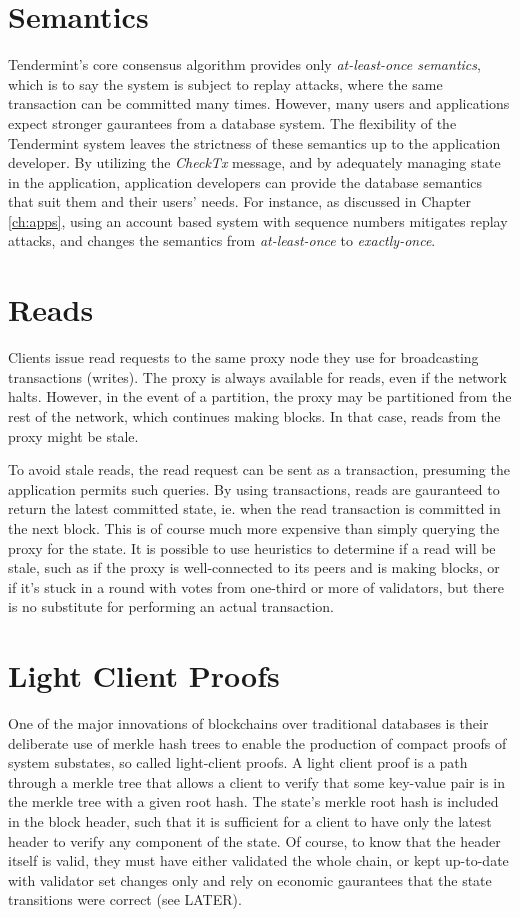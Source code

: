 \section{Semantics}

Tendermint's core consensus algorithm provides only \emph{at-least-once semantics}, 
which is to say the system is subject to replay attacks, 
where the same transaction can be committed many times.
However, many users and applications expect stronger gaurantees from a database system.
The flexibility of the Tendermint system leaves the strictness of these semantics up to the application developer.
By utilizing the \emph{CheckTx} message, and by adequately managing state in the application, 
application developers can provide the database semantics that suit them and their users' needs.
For instance, as discussed in Chapter \ref{ch:apps}, 
using an account based system with sequence numbers mitigates replay attacks,
and changes the semantics from \emph{at-least-once} to \emph{exactly-once}.

\section{Reads} 

Clients issue read requests to the same proxy node they use for broadcasting transactions (writes).
The proxy is always available for reads, even if the network halts.
However, in the event of a partition, the proxy may be partitioned from the rest of the network, which continues making blocks.
In that case, reads from the proxy might be stale.

To avoid stale reads, the read request can be sent as a transaction, presuming the application permits such queries.
By using transactions, reads are gauranteed to return the latest committed state, ie. when the read transaction is committed in the next block.
This is of course much more expensive than simply querying the proxy for the state.
It is possible to use heuristics to determine if a read will be stale,
such as if the proxy is well-connected to its peers and is making blocks, 
or if it's stuck in a round with votes from one-third or more of validators,
but there is no substitute for performing an actual transaction.

\section{Light Client Proofs}

One of the major innovations of blockchains over traditional databases is their deliberate use of merkle hash trees to enable the production
of compact proofs of system substates, so called light-client proofs.
A light client proof is a path through a merkle tree that allows a client to verify that some key-value pair is in the merkle tree with a given root hash.
The state's merkle root hash is included in the block header, such that it is sufficient for a client to have only the latest header to verify any component of the state.
Of course, to know that the header itself is valid, they must have either validated the whole chain, 
or kept up-to-date with validator set changes only and rely on economic gaurantees that the state transitions were correct (see LATER).


